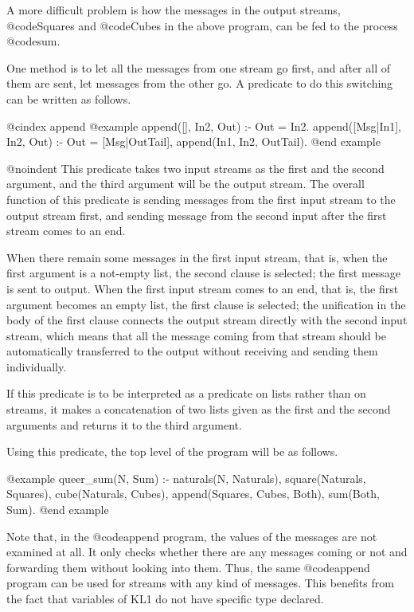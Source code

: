 {A more difficult problem is how the messages in the output streams,
@code{Squares} and @code{Cubes} in the above program, can be fed to the
process @code{sum}.

One method is to let all the messages from one stream go first, and
after all of them are sent, let messages from the other go.  A predicate
to do this switching can be written as follows.

@cindex append
@example
append([], In2, Out) :- Out = In2.
append([Msg|In1], In2, Out) :-
    Out = [Msg|OutTail],
    append(In1, In2, OutTail).
@end example

@noindent
This predicate takes two input streams as the first and the second
argument, and the third argument will be the output stream.  The overall
function of this predicate is sending messages from the first input
stream to the output stream first, and sending message from the second
input after the first stream comes to an end.

When there remain some messages in the first input stream, that is,
when the first argument is a not-empty list, the second clause is
selected; the first message is sent to output.  When the first input
stream comes to an end, that is, the first argument becomes an empty
list, the first clause is selected; the unification in the body of the
first clause connects the output stream directly with the second input
stream, which means that all the message coming from that stream
should be automatically transferred to the output without receiving
and sending them individually.

If this predicate is to be interpreted as a predicate on lists rather
than on streams, it makes a concatenation of two lists given as the
first and the second arguments and returns it to the third argument.

Using this predicate, the top level of the program will be as follows.

@example
queer_sum(N, Sum) :-
    naturals(N, Naturals),
    square(Naturals, Squares),
    cube(Naturals, Cubes),
    append(Squares, Cubes, Both),
    sum(Both, Sum).
@end example

Note that, in the @code{append} program, the values of the messages
are not examined at all.  It only checks whether there are any
messages coming or not and forwarding them without looking into them.
Thus, the same @code{append} program can be used for streams with
any kind of messages.  This benefits from the fact that variables of
KL1 do not have specific type declared.

}
